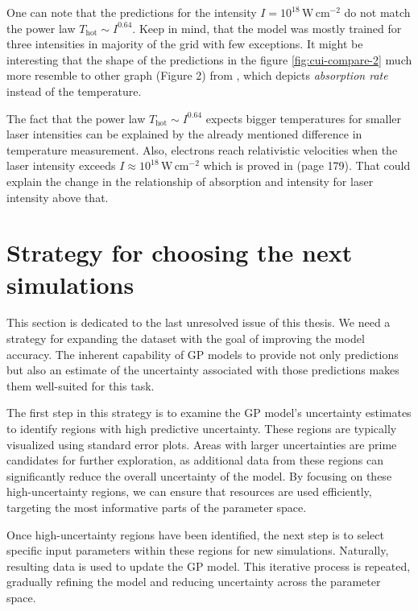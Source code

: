 One can note that the predictions for the intensity $I = 10^{18} \, \mathrm{W} \, \mathrm{cm}^{-2}$ do not match the power law $T_\mathrm{hot} \sim I^{0.64}$. Keep in mind, that the model was mostly trained for three intensities in majority of the grid with few exceptions. It might be interesting that the shape of the predictions in the figure \ref{fig:cui-compare-2} much more resemble to other graph (Figure 2) from \cite{cui2013}, which depicts \textit{absorption rate} instead of the temperature.

The fact that the power law $T_\mathrm{hot} \sim I^{0.64}$ expects bigger temperatures for smaller laser intensities can be explained by the already mentioned difference in temperature measurement. Also, electrons reach relativistic velocities when the laser intensity exceeds $I \approx 10^{18} \, \mathrm{W} \, \mathrm{cm}^{-2}$ which is proved in \cite{gibbon2005} (page 179). That could explain the change in the relationship of absorption and intensity for laser intensity above that.



\section{Strategy for choosing the next simulations}

This section is dedicated to the last unresolved issue of this thesis. We need a strategy for expanding the dataset with the goal of improving the model accuracy. The inherent capability of GP models to provide not only predictions but also an estimate of the uncertainty associated with those predictions makes them well-suited for this task.

The first step in this strategy is to examine the GP model's uncertainty estimates to identify regions with high predictive uncertainty. These regions are typically visualized using standard error plots. Areas with larger uncertainties are prime candidates for further exploration, as additional data from these regions can significantly reduce the overall uncertainty of the model. By focusing on these high-uncertainty regions, we can ensure that resources are used efficiently, targeting the most informative parts of the parameter space.

Once high-uncertainty regions have been identified, the next step is to select specific input parameters within these regions for new simulations. Naturally, resulting data is used to update the GP model. This iterative process is repeated, gradually refining the model and reducing uncertainty across the parameter space.

